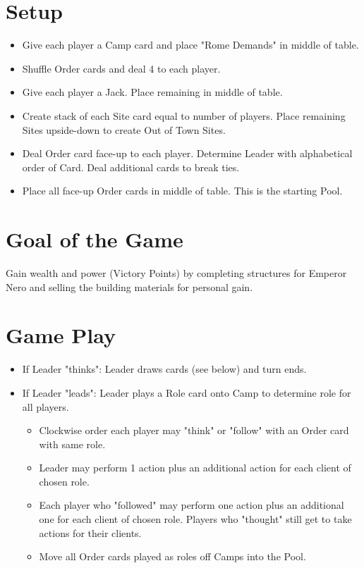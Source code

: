 \documentclass[12pt]{article}
\newenvironment{itemizeCustom}
{\begin{itemize}
  \setlength{\itemsep}{1pt}
  \setlength{\parskip}{0pt}
  \setlength{\parsep}{0pt}}
{\end{itemize}}
\begin{document}
\begin{multicols*}{2}

\section*{Setup}
\begin{itemizeCustom}
    \item Give each player a Camp card and place "Rome Demands" in middle of table.
    \item Shuffle Order cards and deal 4 to each player.
    \item Give each player a Jack. Place remaining in middle of table.
    \item Create stack of each Site card equal to number of players. Place remaining Sites upside-down to create Out of Town Sites.
    \item Deal Order card face-up to each player. Determine Leader with alphabetical order of Card. Deal additional cards to break ties.
    \item Place all face-up Order cards in middle of table. This is the starting Pool.
\end{itemizeCustom} 

\section*{Goal of the Game}
Gain wealth and power (Victory Points) by completing structures for Emperor Nero and selling the building materials for personal gain.

\section*{Game Play}
\begin{itemizeCustom}
    \item If Leader "thinks": Leader draws cards (see below) and turn ends.
    \item If Leader "leads": Leader plays a Role card onto Camp to determine role for all players.
        \begin{itemizeCustom}
            \item Clockwise order each player may "think" or "follow" with an Order card with same role.
            \item Leader may perform 1 action plus an additional action for each client of chosen role.
            \item Each player who "followed" may perform one action plus an additional one for each client of chosen role. Players who "thought" still get to take actions for their clients.
            \item Move all Order cards played as roles off Camps into the Pool.
        \end{itemizeCustom}
\end{itemizeCustom}


\end{multicols*}
\end{document}
